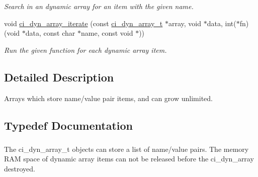\begin{DoxyCompactItemize}
\begin{DoxyCompactList}\small\item\em Search in an dynamic array for an item with the given name. \item\end{DoxyCompactList}\item 
void \hyperlink{group__DYNAMIC__ARRAYS_ga8d67e00fea262a121c51d115782396dd}{ci\_\-dyn\_\-array\_\-iterate} (const \hyperlink{group__DYNAMIC__ARRAYS_ga26fd79bb931b37f9c02deca8da6fe638}{ci\_\-dyn\_\-array\_\-t} $\ast$array, void $\ast$data, int($\ast$fn)(void $\ast$data, const char $\ast$name, const void $\ast$))
\begin{DoxyCompactList}\small\item\em Run the given function for each dynamic array item. \item\end{DoxyCompactList}\end{DoxyCompactItemize}


\subsection{Detailed Description}
Arrays which store name/value pair items, and can grow unlimited. 

\subsection{Typedef Documentation}
\hypertarget{group__DYNAMIC__ARRAYS_ga26fd79bb931b37f9c02deca8da6fe638}{
\subsubsection[{ci\_\-dyn\_\-array\_\-t}]{}}
\label{group__DYNAMIC__ARRAYS_ga26fd79bb931b37f9c02deca8da6fe638}


The ci\_\-dyn\_\-array\_\-t objects can store a list of name/value pairs. The memory RAM space of dynamic array items can not be released before the ci\_\-dyn\_\-array destroyed. 

